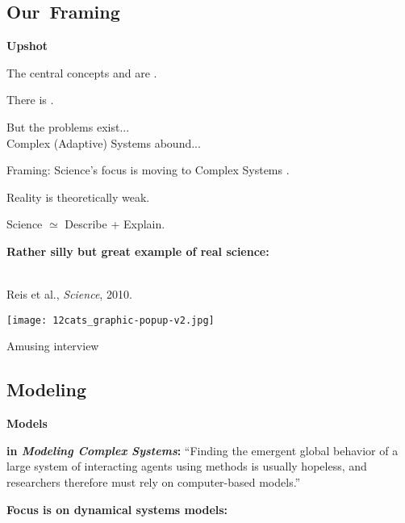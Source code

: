 \begin{frame}[plain]
\begin{frame}[plain]
\subsection{Our\ Framing}

  \textbf{Upshot}

  
  
  
    The central concepts  and
     are .
  
    There is .
  
    But the problems exist...\\
    \qquad \qquad Complex (Adaptive) Systems abound...
  
    Framing: Science's focus is moving to Complex Systems 
    .
  
  
    Reality is theoretically weak.
  
    Science $\simeq$ Describe + Explain.
  
  


  \textbf{Rather silly but great example of real science:}

  \\
  Reis et al., \textit{Science}, 2010.

  \medskip

  \texttt{[image: 12cats\_graphic-popup-v2.jpg]}

  Amusing interview 



\subsection{Modeling}

  \textbf{Models}

  \textbf{ in \textit{Modeling Complex Systems}:}
    ``Finding the emergent global behavior of a large
    system of interacting agents using methods is usually
    hopeless, and researchers therefore must rely on
    computer-based models.''
  

  \textbf{Focus is on dynamical systems models:}
    

\end{frame}
\end{frame}
